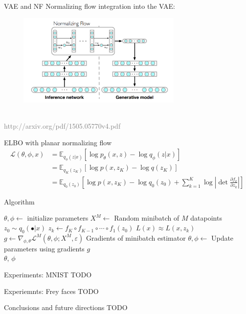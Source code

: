 \documentclass[unicode,11pt]{beamer}
\begin{document}
\begin{frame}[fragile]{VAE and NF}
  Normalizing flow integration into the VAE:\\
  \begin{figure}[htbp]
    \includegraphics[height=130pt, keepaspectratio = true]{images/norFlow}
  \end{figure}
  ~\\
  \tiny \textcolor{gray}{http://arxiv.org/pdf/1505.05770v4.pdf}
\end{frame}


\begin{frame}[fragile]{ELBO with planar normalizing flow}
  \begin{align*}
  \mathcal{L}(\theta, \phi, x) &= \mathbb{E}_{q_\phi(z|x)} \left[ \log p_\theta(x, z) - \log q_\phi(z | x) \right] \\
  &= \mathbb{E}_{q_K(z_K)} \left[ \log p(x, z_K) - \log q(z_K) \right] \\
  &= \mathbb{E}_{q_0(z_0)} \left[ \log p(x, z_K) - \log q_0(z_0) + \sum_{k=1}^K \log \left\vert \det
  \frac{\partial f_k}  {\partial z_k} \right\vert \right]
  \end{align*}
\end{frame}


\begin{frame}[fragile]{Algorithm}
  \begin{algorithmic}
    \State $\theta, \phi \gets$ initialize parameters
    \Repeat
       \State $X^M \gets$ Random minibatch of $M$ datapoints
       \State $z_0 \sim q_0(\bullet|x)$
       \State $z_k \gets f_K \circ f_{K-1} \circ \cdots \circ f_1(z_0)$
       \State $L(x) \approx L(x, z_k)$
       \State $g \gets \nabla_{\phi, \theta} \mathcal{L}^M(\theta, \phi; X^M, \varepsilon) $ Gradients of minibatch estimator
       \State $\theta, \phi \gets$ Update parameters using gradients $g$
    \\
    \Return $\theta$, $\phi$
  \end{algorithmic}

\end{frame}


\begin{frame}[fragile]{Experiments: MNIST}
  TODO
\end{frame}


\begin{frame}[fragile]{Experiemnts: Frey faces}
  TODO
\end{frame}


\begin{frame}[fragile]{Conclusions and future directions}
  TODO
\end{frame}
\end{document}
